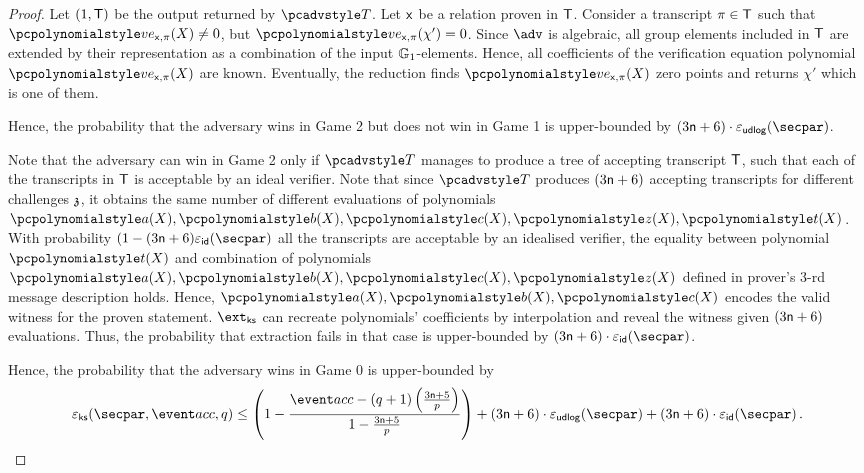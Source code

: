 \begin{proof}
  Let $(1, \mathsf{T})$ be the output returned by $\tdv$. Let $\mathsf{x}$ be a relation proven in $\mathsf{T}$.  Consider a transcript $\pi \in \mathsf{T}$ such that $\vereq_{\inp, \zkproof}(X) \neq 0$, but $\vereq_{\inp, \zkproof}(\chi') = 0$. Since $\adv$ is algebraic, all group elements included in $\mathsf{T}$ are extended by their representation as a combination of the input $\mathbb{G}_1$-elements. Hence, all coefficients of the verification equation polynomial $\vereq_{\inp, \zkproof}(X)$ are known. 
  Eventually, the reduction finds $\vereq_{\inp, \zkproof}(X)$ zero points and returns $\chi'$ which is one of them.
    
  Hence, the probability that the adversary wins in Game 2 but does not win in Game 1 is upper-bounded by $(3 \noofc + 6) \cdot \epsudlog (\secpar)$.

  Note that the adversary can win in Game 2 only if $\tdv$ manages to produce a tree of accepting transcript $\mathsf{T}$, such that each of the transcripts in $\mathsf{T}$ is acceptable by an ideal verifier. Note that since $\tdv$ produces $(3 \mathsf{n} + 6)$ accepting transcripts for different challenges $\mathfrak{z}$, it obtains the same number of different evaluations of polynomials $\p{a} (X), \p{b} (X), \p{c} (X), \p{z} (X), \p{t} (X)$. With probability $(1 - (3 \noofc + 6) \epsid (\secpar)$ all the transcripts are acceptable by an idealised verifier, the equality between polynomial $\p{t} (X)$ and combination of polynomials $\p{a} (X), \p{b} (X), \p{c} (X), \p{z} (X)$ defined in prover's $3$-rd message description holds. Hence, $\p{a} (X), \p{b} (X), \p{c} (X)$ encodes the valid witness for the proven statement. $\extcss$ can recreate polynomials' coefficients by interpolation and reveal the witness given $(3 \mathsf{n} + 6)$ evaluations. Thus, the probability that extraction fails in that case is upper-bounded by $(3 \noofc + 6) \cdot \epsid(\secpar)$.

  Hence, the probability that the adversary wins in Game 0 is upper-bounded by 
  \[
    \epscss(\secpar,\accProb, q) \leq \left(1 - \frac{\accProb - (q + 1) \left(\frac{3 \noofc + 5}{p} \right)}{1 - \frac{3 \noofc + 5}{p}}\right) + (3 \noofc + 6) \cdot \epsudlog (\secpar) + (3 \noofc + 6) \cdot \epsid (\secpar)\,. 
  \]
 \end{proof}

